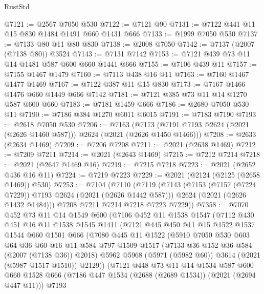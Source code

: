 \begin{lexlean}{RustStd}
\begin{coremodule}
{\begin{coremodule}
{{{{{{{{{{{{{{{{@7121 := @2567 @7050 @530
@7122 := @7121 @90
@7131 := @7122 @441 @11 @15 @830 @1484 @1491 @660 @1431 @666
@7133 := @1999 @7050 @530
@7137 := @7133 @80 @11 @80 @830
@7138 := @2008 @7050
@7142 := @7137 (@2007 (@7138 @80)) @3524
@7143 := @7131 @7142
@7153 := @7121 @439 @73 @11 @14 @1481 @587 @600 @660 @1441 @666
@7155 := @7106 @439 @11
@7157 := @7155 @1467 @1479
@7160 := @7113 @438 @16 @11
@7163 := @7160 @1467 @1477 @1469
@7167 := @7122 @387 @11 @15 @830
@7173 := @7167 @1466 @1476 @660 @1449 @666 @7142
@7181 := @7121 @385 @73 @11 @14 @1270 @587 @600 @660
@7183 := @7181 @1459 @666
@7186 := @2680 @7050 @530 @11
@7190 := @7186 @384 @1270 @6011 @6015
@7191 := @7183 @7190
@7193 := @2618 @7050 @530
@7206 := @7163
    (@7173 (@7191 @7193 @2624 (@2021 (@2626 @1460 @587))) @2624 (@2021 (@2626 @1450 @1466)))
@7208 := @2633 (@2634 @1469)
@7209 := @7206 @7208
@7211 := @2021 (@2638 @1469)
@7212 := @7209 @7211
@7214 := @2021 (@2643 @1469)
@7215 := @7212 @7214
@7218 := @2021 (@2647 @1469 @16)
@7219 := @7215 @7218
@7223 := @2021 (@2652 @436 @16 @11)
@7224 := @7219 @7223
@7229 := @2021 (@2124 (@2125 (@2658 @1469)) @530)
@7253 := @7104
    (@7110
      (@7119
        (@7143
          (@7153 (@7157 (@7224 @7229)) @7193 @2624 (@2021 (@2626 @1442 @587)))
          @2624
          (@2021 (@2626 @1432 @1484)))
        @7208
        @7211
        @7214
        @7218
        @7223
        @7229))
@7358 := @7070
    @452
    @73
    @11
    @14
    @1549
    @600
    (@7106
      @452
      @11
      @1538
      @1547
      (@7112
        @430
        @451
        @16
        @11
        @1538
        @1545
        @1411
        (@7121
          @445
          @450
          @11
          @15
          @1522
          @1537
          @1544
          @660
          @1501
          @666
          (@7080
            @445
            @11
            @1522
            (@5910
              @7050
              @530
              @603
              @64
              @36
              @60
              @16
              @11
              @584
              @797
              @1509
              @1517
              (@7133 @36 @152 @36 @584 (@2007 (@7138 @36)) @2018)
              @5962
              @5968
              (@5971 (@5982 @60))
              @3614
              (@2021 (@5987 @1517 @1510))
              @2129))
          (@7121
            @448
            @73
            @11
            @14
            @1534
            @587
            @600
            @660
            @1528
            @666
            (@7186 @447 @1534 (@2688 (@2689 @1534)) (@2021 (@2694 @447 @11)))
            @7193
}}}}}}}}}}}}}}}}
\end{coremodule}}
\end{coremodule}
\end{lexlean}
